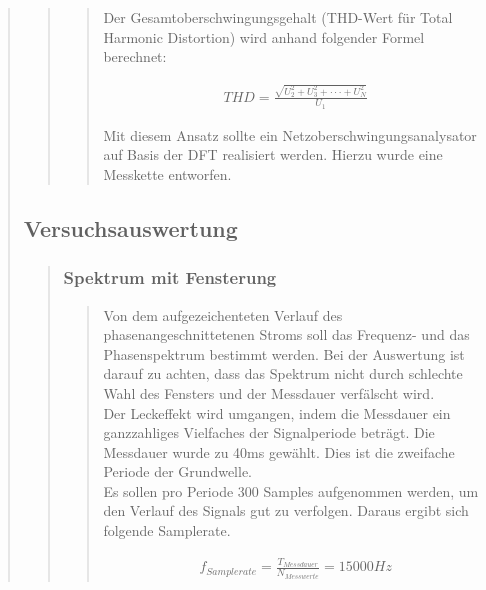 \begin{quote}
\begin{quote}
\begin{quote}
		Der Gesamtoberschwingungsgehalt (THD-Wert für Total Harmonic Distortion) wird
		anhand folgender Formel berechnet:
		
		\begin{align}
		THD = \frac{\sqrt{U_2^2 + U_3^2 + \cdot \cdot \cdot + U_N^2}}{U_1}
		\end{align} 
		
		Mit diesem Ansatz sollte ein Netzoberschwingungsanalysator auf Basis der DFT
		realisiert werden. Hierzu wurde eine Messkette entworfen.
		
		\end{quote}%
	\end{quote}%
	
	\subsection{Versuchsauswertung}
    \begin{quote}
        \subsubsection{Spektrum mit Fensterung}
		\begin{quote}
            Von dem aufgezeichenteten Verlauf des phasenangeschnittetenen Stroms soll das Frequenz- und das
            Phasenspektrum bestimmt werden. Bei der Auswertung ist darauf zu achten, dass das Spektrum nicht durch
            schlechte Wahl des Fensters und der
            Messdauer verfälscht wird.\\
            Der Leckeffekt wird umgangen, indem die Messdauer ein ganzzahliges Vielfaches der Signalperiode beträgt. Die
            Messdauer wurde zu 40ms gewählt. Dies ist die zweifache Periode der Grundwelle.\\
            Es sollen pro Periode 300 Samples aufgenommen werden, um den Verlauf des Signals gut zu verfolgen.
            Daraus ergibt sich folgende Samplerate.
            
            \begin{align}
              f_{Samplerate} = \frac{T_{Messdauer}}{N_{Messwerte}} = 15000Hz
            \end{align} 
            

\end{quote}
\end{quote}
\end{quote}
